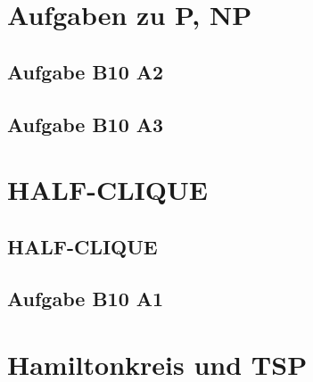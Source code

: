\section{Aufgaben zu P, NP}
\subsection{Aufgabe B10 A2}
\subsection{Aufgabe B10 A3}

\section{HALF-CLIQUE}
\subsection{HALF-CLIQUE}
\subsection{Aufgabe B10 A1}

\section{Hamiltonkreis und TSP}
